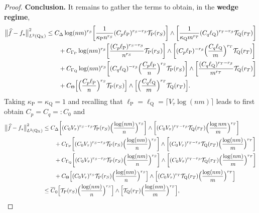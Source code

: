 \documentclass[10pt,a4paper]{amsart}
\renewcommand{\P}{\operatorname{P}}
\newcommand{\Q}{\operatorname{Q}}
\renewcommand{\k}{\kappa}
\newcommand{\mT}{\mathcal{T}}
\newcommand{\ol}{\overline}
\newcommand{\sX}{\mathrm{X}}
\newcommand{\wh}{\widehat}
\begin{document}
\begin{proof}
    \noindent\textbf{Conclusion.} It remains to gather the terms to obtain, in the \textbf{wedge regime},
    \begin{align*}
        \big\|\wh f - f_*\big\|^2_{L^2(\Q\mathstrut_{\!\sX})} &\leq C_{\Delta}\log(nm)^{r_\beta}\bigg[\frac{1}{\k_{\P}n^{r_S}}(C_p\ell_{\P})^{r_S - r_\beta}\mT_{\P}(r_S)\bigg]\wedge\bigg[\frac{1}{\k_{\Q}m^{r_T}}(C_q\ell_{\Q})^{r_T - r_\beta}\mT_{\Q}(r_T)\bigg]\\
        &\qquad + C_{\Gamma_{\P}}\log(nm)^{r_\beta}\bigg[\frac{(C_p\ell_{\P})^{r_S - r_\beta}}{n^{r_S}}\mT_{\P}(r_S)\bigg] \wedge \bigg[(C_p\ell_{\P})^{-r_\beta}\Big(\frac{C_q\ell_{\Q}}{m}\Big)^{r_T}\mT_{\Q}(r_T)\bigg]\\
        &\qquad + C_{\Gamma_{\Q}}\log(nm)^{r_\beta}\bigg[(C_q\ell_{\Q})^{-r_\beta}\Big(\frac{C_p\ell_{\P}}{n}\Big)^{r_S}\mT_{\P}(r_S)\bigg]\wedge \bigg[\frac{(C_q\ell_{\Q})^{r_T - r_\beta}}{m^{r_T}}\mT_{\Q}(r_T)\bigg]\\
        &\qquad + C_{\Theta}\Big[\Big(\frac{C_p\ell_{\P}}{n}\Big)^{r_S}\mT_{\P}(r_S)\Big]\wedge \Big[\Big(\frac{C_q\ell_{\Q}}{m}\Big)^{r_T}\mT_{\Q}(r_T)\Big].
    \end{align*}
    Taking $\k_{\P} = \k_{\Q} = 1$ and recalling that $\ell_{\P} = \ell_{\Q} = \lceil V_\tau\log(nm)\rceil$ leads to first obtain $C_p = C_q =: C_0$ and
    \begin{align*}
        \big\|\wh f - f_*\big\|^2_{L^2(\Q\mathstrut_{\!\sX})} &\leq C_{\Delta}\bigg[(C_0V_\tau)^{r_S - r_\beta}\mT_{\P}(r_S)\Big(\frac{\log(nm)}{n}\Big)^{r_S}\bigg]\wedge\bigg[(C_0V_\tau)^{r_T - r_\beta}\mT_{\Q}(r_T)\Big(\frac{\log nm}{m}\Big)^{r_T}\bigg]\\
        &\qquad + C_{\Gamma_{\P}}\bigg[(C_0V_\tau)^{r_S - r_\beta}\mT_{\P}(r_S)\Big(\frac{\log (nm)}{n}\Big)^{r_S}\bigg] \wedge \bigg[(C_0V_\tau)^{r_T-r_\beta}\mT_{\Q}(r_T)\Big(\frac{\log(nm)}{m}\Big)^{r_T}\bigg]\\
        &\qquad + C_{\Gamma_{\Q}}\bigg[(C_0V_\tau)^{r_S-r_\beta}\mT_{\P}(r_S)\Big(\frac{\log(nm)}{n}\Big)^{r_S}\bigg]\wedge \bigg[(C_0V_\tau)^{r_T - r_\beta}\mT_{\Q}(r_T)\Big(\frac{\log(nm)}{m}\Big)^{r_T}\bigg]\\
        &\qquad + C_{\Theta}\Big[(C_0V_\tau)^{r_S}\mT_{\P}(r_S)\Big(\frac{\log(nm)}{n}\Big)^{r_S}\Big]\wedge \Big[(C_0V_\tau)^{r_T}\mT_{\Q}(r_T)\Big(\frac{\log(nm)}{m}\Big)^{r_T}\Big]\\
        &\leq \ol C_0\Big[\mT_{\P}(r_S)\Big(\frac{\log(nm)}{n}\Big)^{r_S}\Big]\wedge \Big[\mT_{\Q}(r_T)\Big(\frac{\log(nm)}{m}\Big)^{r_T}\Big],
    \end{align*}

\end{proof}
\end{document}
